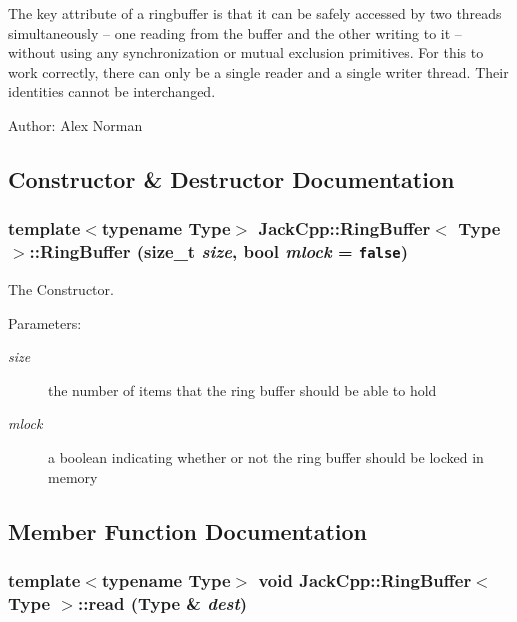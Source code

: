 The key attribute of a ringbuffer is that it can be safely accessed by two threads simultaneously -- one reading from the buffer and the other writing to it -- without using any synchronization or mutual exclusion primitives. For this to work correctly, there can only be a single reader and a single writer thread. Their identities cannot be interchanged.

\begin{Desc}
\item[Author:]Alex Norman \end{Desc}


\subsection{Constructor \& Destructor Documentation}
\subsubsection[RingBuffer]{\setlength{\rightskip}{0pt plus 5cm}template$<$typename Type$>$ {\bf JackCpp::RingBuffer}$<$ Type $>$::{\bf RingBuffer} (size\_\-t {\em size}, \/  bool {\em mlock} = {\tt false})\hspace{0.3cm}{\tt  [inline]}}\label{classJackCpp_1_1RingBuffer_3f6c77aa4e902a1e3d1d73b3acbd2ebf}


The Constructor. 

\begin{Desc}
\item[Parameters:]
\begin{description}
\item[{\em size}]the number of items that the ring buffer should be able to hold \item[{\em mlock}]a boolean indicating whether or not the ring buffer should be locked in memory \end{description}
\end{Desc}


\subsection{Member Function Documentation}
\subsubsection[read]{\setlength{\rightskip}{0pt plus 5cm}template$<$typename Type$>$ void {\bf JackCpp::RingBuffer}$<$ Type $>$::read (Type \& {\em dest})\hspace{0.3cm}{\tt  [inline]}}\label{classJackCpp_1_1RingBuffer_8629652988f8d654e51d0ee06eb0a456}



